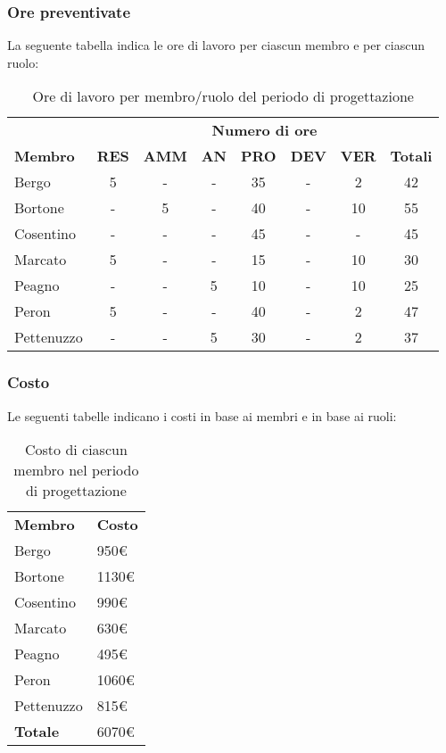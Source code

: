 	\subsubsection{Ore preventivate}
		La seguente tabella indica le ore di lavoro per ciascun membro e per ciascun ruolo:
		\begin{table}[h]
		\centering
		\begin{tabular}{| l | c c c c c c | c |}
			\rowcolor{LightBlue}
			& \multicolumn{7}{c}{\textbf{\color{white}Numero di ore}}	\\
	
			\rowcolor{LightBlue}
			\textbf{\color{white}Membro}
			& \textbf{\color{white}RES}
			& \textbf{\color{white}AMM}
			& \textbf{\color{white}AN}
			& \textbf{\color{white}PRO}
			& \textbf{\color{white}DEV}
			& \textbf{\color{white}VER}
			& \textbf{\color{white}Totali}\\

			Bergo      & 5 & - & - & 35 & - & 2 & 42 \\
			Bortone    & - & 5 & - & 40 & - & 10 & 55 \\
			Cosentino  & - & - & - & 45 & - & - & 45 \\
			Marcato    & 5 & - & - & 15 & - & 10 & 30 \\
			Peagno     & - & - & 5 & 10 & - & 10 & 25 \\
			Peron      & 5 & - & - & 40 & - & 2 & 47 \\
			Pettenuzzo & - & - & 5 & 30 & - & 2 & 37 \\ \hline
		\end{tabular}
		\caption{Ore di lavoro per membro/ruolo del periodo di progettazione}
		\end{table}		
		
	\subsubsection{Costo}
		Le seguenti tabelle indicano i costi in base ai membri e in base ai ruoli:	
		\begin{table}[h]
		\centering
		\begin{tabular}{| l | l |}
			\rowcolor{LightBlue}
			\textbf{\color{white}Membro}
			& \textbf{\color{white}Costo}\\
			
			Bergo				& 950€\\
			Bortone			& 1130€\\
			Cosentino		& 990€\\
			Marcato			& 630€\\
			Peagno				& 495€\\
			Peron				& 1060€\\
			Pettenuzzo		& 815€\\ \hline
			\textbf{Totale} & 6070€\\ \hline
		\end{tabular}
		\caption{Costo di ciascun membro nel periodo di progettazione}
		\end{table}
		
